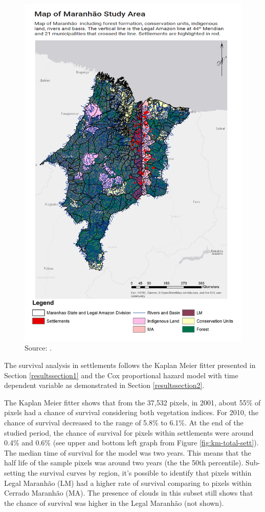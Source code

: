 \begin{figure}[H]
  \centering
  \includegraphics[width=1\textwidth, inner]{Settlements_Map.png}
\caption{Source: \citep{MMMAwebsite,nugeo_2018}.}
\label{fig:delimitacaosett}
\end{figure}

The survival analysis in settlements follows the  Kaplan Meier fitter presented in Section \ref{resultssection1} and the Cox proportional hazard model with time dependent variable as demonstrated in Section \ref{resultssection2}. 

The Kaplan Meier fitter shows that from the 37,532 pixels, in 2001, about 55\% of pixels had a chance of survival considering both vegetation indices. For 2010, the chance of survival decreased to the range of 5.8\% to 6.1\%. At the end of the studied period, the chance of survival for pixels within settlements were around 0.4\% and 0.6\% (see upper and bottom left graph from Figure \ref{fig:km-total-sett}). The median time of survival for the model was two years. This means that the half life of the sample pixels was around two years (the the 50th percentile). Sub-setting the survival curves by region, it's possible to identify that pixels within Legal Maranhão (LM) had a higher rate of survival comparing to pixels within Cerrado Maranhão (MA). The presence of clouds in this subset still shows that the chance of survival was higher in the Legal Maranhão (not shown). 

